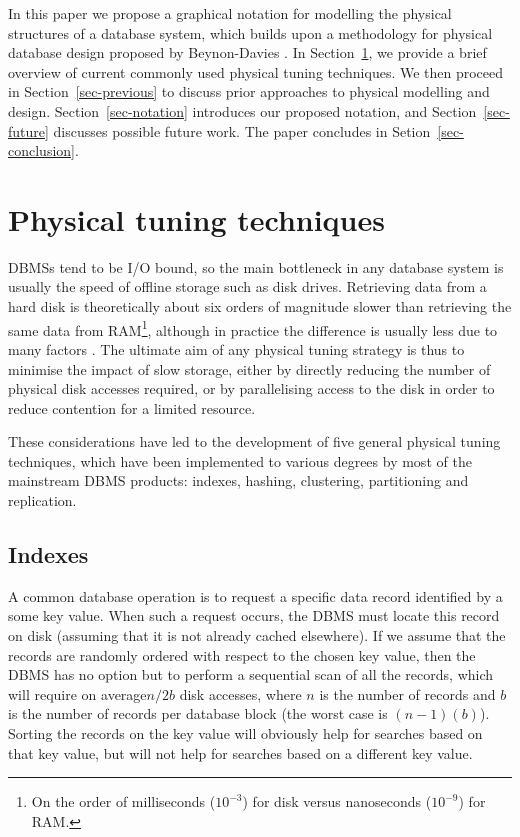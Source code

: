 \documentclass{llncs}
\begin{document}
In this paper we propose a graphical notation for modelling the physical structures of a database system, which builds upon a methodology for physical database design proposed by Beynon-Davies \cite{BeDa-P-1992-PDD}. In Section~\ref{sec-techniques}, we provide a brief overview of current commonly used physical tuning techniques. We then proceed in Section~\ref{sec-previous} to discuss prior approaches to physical modelling and design. Section~\ref{sec-notation} introduces our proposed notation, and Section~\ref{sec-future} discusses possible future work. The paper concludes in Setion~\ref{sec-conclusion}.


\section{Physical tuning techniques}
\label{sec-techniques}

DBMSs tend to be I/O bound, so the main bottleneck in any database system is usually the speed of offline storage such as disk drives. Retrieving data from a hard disk is theoretically about six orders of magnitude slower than retrieving the same data from RAM\footnote{On the order of milliseconds (\(10^{-3}\)) for disk versus nanoseconds (\(10^{-9}\)) for RAM.}, although in practice the difference is usually less due to many factors \cite{Eric-Schmidt-Google}. The ultimate aim of any physical tuning strategy is thus to minimise the impact of slow storage, either by directly reducing the number of physical disk accesses required, or by parallelising access to the disk in order to reduce contention for a limited resource.

These considerations have led to the development of five general physical tuning techniques, which have been implemented to various degrees by most of the mainstream DBMS products: indexes, hashing, clustering, partitioning and replication.

\subsection{Indexes}

A common database operation is to request a specific data record identified by a some key value. When such a request occurs, the DBMS must locate this record on disk (assuming that it is not already cached elsewhere). If we assume that the records are randomly ordered with respect to the chosen key value, then the DBMS has no option but to perform a sequential scan of all the records, which will require on average\(n/2b\) disk accesses, where \(n\) is the number of records and \(b\) is the number of records per database block (the worst case is \((n - 1)(b)\)). Sorting the records on the key value will obviously help for searches based on that key value, but will not help for searches based on a different key value.
\end{document}
